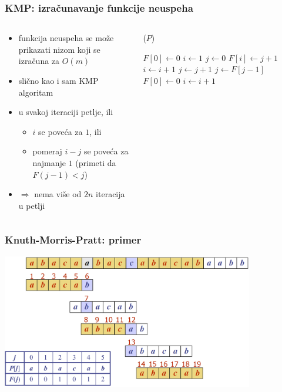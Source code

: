 \documentclass[compress]{beamer}
\begin{document}
\begin{frame}[fragile,shrink=12]
  \frametitle{KMP: izračunavanje funkcije neuspeha}
  \begin{columns}
    \begin{column}[t]{6cm}
      \begin{itemize}
        \item funkcija neuspeha se može prikazati nizom koji se izračuna za $O(m)$
        \item slično kao i sam KMP algoritam
        \item u svakoj iteraciji petlje, ili
        \begin{itemize}
          \item $i$ se poveća za $1$, ili
          \item pomeraj $i-j$ se poveća za najmanje $1$ (primeti da $F(j-1)<j$)
        \end{itemize}
        \item $\Rightarrow$ nema više od $2n$ iteracija u petlji
      \end{itemize}
    \end{column}
    \begin{column}[t]{6cm}
      ($P$)
      \begin{algorithmic}
        \STATE $F[0] \leftarrow 0$
        \STATE $i \leftarrow 1$
        \STATE $j \leftarrow 0$
            \STATE {}
            \STATE $F[i] \leftarrow j+1$
            \STATE $i \leftarrow i+1$
            \STATE $j \leftarrow j+1$
            \STATE {}
            \STATE $j \leftarrow F[j-1]$
          \ELSE
            \STATE $F[0] \leftarrow 0$ 
            \STATE $i \leftarrow i + 1$
          \ENDIF
        \ENDWHILE
      \end{algorithmic}    
    \end{column}
  \end{columns}
\end{frame}

\begin{frame}[fragile]
  \frametitle{Knuth-Morris-Pratt: primer}
  \begin{center}
    \includegraphics[width=11cm]{asp-13-pic07.png}
  \end{center}
\end{frame}
\end{document}
